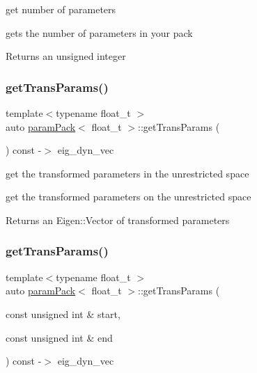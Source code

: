 get number of parameters 

gets the number of parameters in your pack \begin{DoxyReturn}{Returns}
an unsigned integer 
\end{DoxyReturn}
\mbox{\label{classparamPack_ae389cdb81dea521ebe21d170c4c855f8}} 
\subsubsection{\texorpdfstring{get\+Trans\+Params()}{getTransParams()}\hspace{0.1cm}{\footnotesize\ttfamily [1/2]}}
{\footnotesize\ttfamily template$<$typename float\+\_\+t $>$ \\
auto \hyperlink{classparamPack}{param\+Pack}$<$ float\+\_\+t $>$\+::get\+Trans\+Params (\begin{DoxyParamCaption}{ }\end{DoxyParamCaption}) const -\/$>$ eig\+\_\+dyn\+\_\+vec}



get the transformed parameters in the unrestricted space 

get the transformed parameters on the unrestricted space \begin{DoxyReturn}{Returns}
an Eigen\+::\+Vector of transformed parameters 
\end{DoxyReturn}
\mbox{\label{classparamPack_a078ccf2804e0cb8e0e02cfda73118c37}} 
\subsubsection{\texorpdfstring{get\+Trans\+Params()}{getTransParams()}\hspace{0.1cm}{\footnotesize\ttfamily [2/2]}}
{\footnotesize\ttfamily template$<$typename float\+\_\+t $>$ \\
auto \hyperlink{classparamPack}{param\+Pack}$<$ float\+\_\+t $>$\+::get\+Trans\+Params (\begin{DoxyParamCaption}\item[{const unsigned int \&}]{start,  }\item[{const unsigned int \&}]{end }\end{DoxyParamCaption}) const -\/$>$ eig\+\_\+dyn\+\_\+vec}




